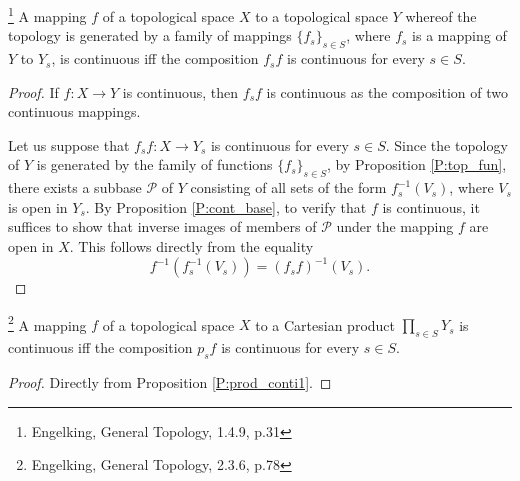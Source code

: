 \begin{proposition} \label{P:prod_conti1}
\footnote{Engelking, General Topology, 1.4.9, p.31}
A mapping $f$ of a topological space $X$ to a topological space $Y$ whereof the
topology is generated by a family of mappings $\{f_s\}_{s\in S}$, where $f_s$ is
a mapping of $Y$ to $Y_s$, is continuous iff the composition $f_s f$ is
continuous for every $s \in S$.
\end{proposition}
\begin{proof}
If $f:X\to Y$ is continuous, then $f_s f$ is continuous as the composition of
two continuous mappings. 

Let us suppose that $f_s f: X\to Y_s$ is continuous for every $s\in S$. Since
the topology of $Y$ is generated by the family of functions $\{f_s\}_{s\in S}$, 
by Proposition \ref{P:top_fun}, there exists a subbase $\mathcal{P}$ of $Y$
consisting of all sets of the form $f_s^{-1}(V_s)$, where $V_s$ is open in
$Y_s$. By Proposition \ref{P:cont_base}, to verify that $f$ is continuous,
it suffices to show that inverse images of members of $\mathcal{P}$ under 
the mapping $f$ are open in $X$. This follows directly from the equality
\[
  f^{-1}(f_s^{-1}(V_s)) = (f_s f)^{-1}(V_s).
\]
\end{proof}

\begin{proposition} \label{P:prod_conti2}
\footnote{Engelking, General Topology, 2.3.6, p.78}
A mapping $f$ of a topological space $X$ to a Cartesian product 
$\prod_{s\in S} Y_s$ is continuous iff the composition $p_s f$ is continuous for
every $s\in S$.
\end{proposition}
\begin{proof}
Directly from Proposition \ref{P:prod_conti1}.
\end{proof}


